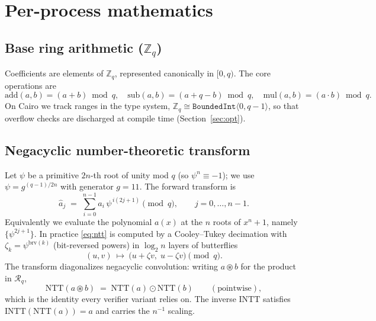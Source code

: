 \documentclass[11pt]{article}
\newcommand{\Zq}{\mathbb{Z}_q}
\newcommand{\Rq}{\mathcal{R}_q}
\newcommand{\NTT}{\mathrm{NTT}}
\newcommand{\INTT}{\mathrm{INTT}}
\begin{document}
\section{Per-process mathematics}

\subsection{Base ring arithmetic ($\Zq$)}
Coefficients are elements of $\Zq$, represented canonically in $[0,q)$. The core operations are
\[
  \mathrm{add}(a,b)=(a+b)\bmod q,\quad
  \mathrm{sub}(a,b)=(a+q-b)\bmod q,\quad
  \mathrm{mul}(a,b)=(a\cdot b)\bmod q .
\]
On Cairo we track ranges in the type system, $\Zq\cong\texttt{BoundedInt}\langle0,q{-}1\rangle$,
so that overflow checks are discharged at compile time (Section~\ref{sec:opt}).

\subsection{Negacyclic number-theoretic transform}
Let $\psi$ be a primitive $2n$-th root of unity mod $q$ (so $\psi^{n}\equiv-1$); we use
$\psi = g^{(q-1)/2n}$ with generator $g=11$. The forward transform is
\begin{equation}
  \hat a_j \;=\; \sum_{i=0}^{n-1} a_i\,\psi^{\,i(2j+1)} \pmod q,\qquad j=0,\dots,n-1 .
  \label{eq:ntt}
\end{equation}
Equivalently we evaluate the polynomial $a(x)$ at the $n$ roots of $x^n+1$, namely
$\{\psi^{2j+1}\}$. In practice \eqref{eq:ntt} is computed by a Cooley--Tukey decimation with
$\zeta_k=\psi^{\mathrm{brv}(k)}$ (bit-reversed powers) in $\log_2 n$ layers of butterflies
\begin{equation}
  (u,v)\ \mapsto\ \bigl(u+\zeta v,\; u-\zeta v\bigr)\pmod q .
  \label{eq:butterfly}
\end{equation}
The transform diagonalizes negacyclic convolution: writing $a\circledast b$ for the product in
$\Rq$,
\begin{equation}
  \NTT(a\circledast b) \;=\; \NTT(a)\odot\NTT(b)\qquad(\text{pointwise}),
  \label{eq:conv}
\end{equation}
which is the identity every verifier variant relies on. The inverse $\INTT$ satisfies
$\INTT(\NTT(a))=a$ and carries the $n^{-1}$ scaling.
\end{document}
